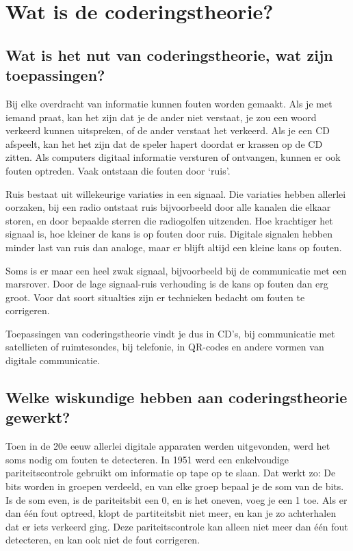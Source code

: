\documentclass{article}
\begin{document}
\section{Wat is de coderingstheorie?}
\subsection{Wat is het nut van coderingstheorie, wat zijn toepassingen?}
Bij elke overdracht van informatie kunnen fouten worden gemaakt. Als je met iemand praat, kan het zijn dat je de ander niet verstaat, je zou een woord verkeerd kunnen uitspreken, of de ander verstaat het verkeerd. Als je een CD afspeelt, kan het het zijn dat de speler hapert doordat er krassen op de CD zitten. Als computers digitaal informatie versturen of ontvangen, kunnen er ook fouten optreden. Vaak ontstaan die fouten door ‘ruis’.

Ruis bestaat uit willekeurige variaties in een signaal. Die variaties hebben allerlei oorzaken, bij een radio ontstaat ruis bijvoorbeeld door alle kanalen die elkaar storen, en door bepaalde sterren die radiogolfen uitzenden. Hoe krachtiger het signaal is, hoe kleiner de kans is op fouten door ruis. Digitale signalen hebben minder last van ruis dan analoge, maar er blijft altijd een kleine kans op fouten.

Soms is er maar een heel zwak signaal, bijvoorbeeld bij de communicatie met een marsrover. Door de lage signaal-ruis verhouding is de kans op fouten dan erg groot. Voor dat soort situalties zijn er technieken bedacht om fouten te corrigeren.

Toepassingen van coderingstheorie vindt je dus in CD's, bij communicatie met satellieten of ruimtesondes, bij telefonie, in QR-codes en andere vormen van digitale communicatie.
\subsection{Welke wiskundige hebben aan coderingstheorie gewerkt?}
Toen in de 20e eeuw allerlei digitale apparaten werden uitgevonden, werd het soms nodig om fouten te detecteren. In 1951 werd een enkelvoudige pariteitscontrole gebruikt om informatie op tape op te slaan. Dat werkt zo: De bits worden in groepen verdeeld, en van elke groep bepaal je de som van de bits. Is de som even, is de pariteitsbit een 0, en is het oneven, voeg je een 1 toe. Als er dan één fout optreed, klopt de partiteitsbit niet meer, en kan je zo achterhalen dat er iets verkeerd ging. Deze pariteitscontrole kan alleen niet meer dan één fout detecteren, en kan ook niet de fout corrigeren.
\end{document}
